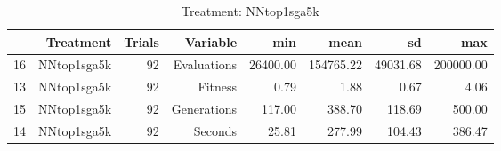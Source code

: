 \begin{table}[ht]
\centering
\begin{tabular}{rrrrrrrr}
  \hline
 & Treatment & Trials & Variable & min & mean & sd & max \\ 
  \hline
16 & NNtop1sga5k &  92 & Evaluations & 26400.00 & 154765.22 & 49031.68 & 200000.00 \\ 
  13 & NNtop1sga5k &  92 & Fitness & 0.79 & 1.88 & 0.67 & 4.06 \\ 
  15 & NNtop1sga5k &  92 & Generations & 117.00 & 388.70 & 118.69 & 500.00 \\ 
  14 & NNtop1sga5k &  92 & Seconds & 25.81 & 277.99 & 104.43 & 386.47 \\ 
   \hline
\end{tabular}
\caption{Treatment: NNtop1sga5k} 
\end{table}
